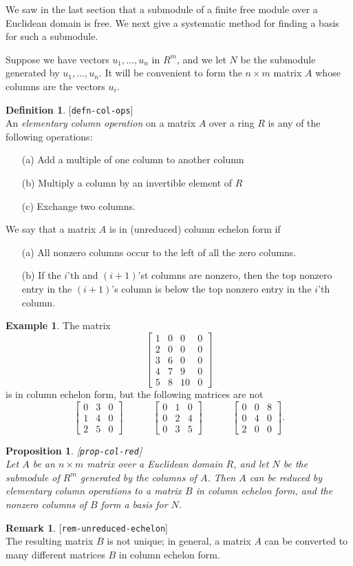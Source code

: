\documentclass{amsart}
\newcommand{\lbl}[1]{\label{#1}\textup{[\texttt{#1}]}\ \\}
\newcommand{\lbl}{\label}
\newcommand{\bbm}       {\left[\begin{matrix}}
\newcommand{\ebm}       {\end{matrix}\right]}
\newcommand{\tm}        {\times}
\renewcommand{\:}{\colon}
\newtheorem{proposition}[theorem]{Proposition}
\theoremstyle{definition}
\newtheorem{remark}[theorem]{Remark}
\newtheorem{definition}[theorem]{Definition}
\newtheorem{example}[theorem]{Example}
\begin{document}
We saw in the last section that a submodule of a finite free module
over a Euclidean domain is free.  We next give a systematic method for
finding a basis for such a submodule.

Suppose we have vectors $u_1,\ldots,u_n$ in $R^m$, and we let $N$ be
the submodule generated by $u_1,\ldots,u_n$.  It will be convenient to
form the $n\tm m$ matrix $A$ whose columns are the vectors $u_i$.  

\begin{definition}\lbl{defn-col-ops}
 An \emph{elementary column operation} on a matrix $A$ over a ring $R$
 is any of the following operations:
 \begin{itemize}
  \item[(a)] Add a multiple of one column to another column
  \item[(b)] Multiply a column by an invertible element of $R$
  \item[(c)] Exchange two columns.
 \end{itemize}
 We say that a matrix $A$ is in (unreduced) column echelon form if 
 \begin{itemize}
  \item[(a)] All nonzero columns occur to the left of all the zero
   columns.
  \item[(b)] If the $i$'th and $(i+1)$'st columns are nonzero, then
   the top nonzero entry in the $(i+1)$'s column is below the top
   nonzero entry in the $i$'th column.
 \end{itemize}
\end{definition}
\begin{example}
 The matrix
 \[ 
    \bbm 1&0&0&0 \\ 2&0&0&0 \\ 3&6&0&0 \\ 4&7&9&0 \\ 5&8&10&0 \ebm
 \]
 is in column echelon form, but the following matrices are not
 \[ \bbm 0&3&0\\1&4&0\\2&5&0 \ebm \hspace{3em}
    \bbm 0&1&0\\0&2&4\\0&3&5 \ebm \hspace{3em}
    \bbm 0&0&8\\0&4&0\\2&0&0 \ebm.
 \]
\end{example}

\begin{proposition}\lbl{prop-col-red}
 Let $A$ be an $n\tm m$ matrix over a Euclidean domain $R$, and let
 $N$ be the submodule of $R^m$ generated by the columns of $A$.  Then
 $A$ can be reduced by elementary column operations to a matrix $B$ in
 column echelon form, and the nonzero columns of $B$ form a basis for
 $N$.  
\end{proposition}
\begin{remark}\lbl{rem-unreduced-echelon}
 The resulting matrix $B$ is not unique; in general, a matrix $A$ can
 be  converted to many different matrices $B$ in column echelon form.
\end{remark}
\end{document}
